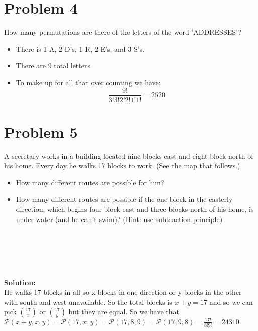 \documentclass{article}
\begin{document}
\section*{Problem 4}
 How many permutations are there of the letters of the word 'ADDRESSES'?
         \begin{itemize}
             \item There is 1 A, 2 D's, 1 R, 2 E's, and 3 S's.
             \item There are 9 total letters
             \item To make up for all that over counting we have: $$\frac{9!}{3!3!2!2!1!1!} = 2520$$
         \end{itemize}
         
\section*{Problem 5}
A secretary works in a building located nine blocks east and eight block north of his home.
Every day he walks 17 blocks to work. (See the map that follows.)
\begin{itemize}
    \item How many different routes are possible for him?
    \item How many different routes are possible if the one block in the easterly direction, which begins four block east and three blocks north of his home,
is under water (and he can't swim)? (Hint: use subtraction principle)
\end{itemize}
\\ \\
\begin{center}
\end{center}
\\ \\
\textbf{Solution: }
\\
He walks 17 blocks in all so x blocks in one direction or y blocks in the other with south and west unavailable. So the total blocks is $x + y = 17$ and so we can pick $\binom{17}{x}$ or $\binom{17}{y}$ but they are equal. So we have that $\mathcal{P}(x+y, x, y) = \mathcal{P}(17, x, y) = \mathcal{P}(17, 8, 9) = \mathcal{P}(17, 9, 8) = \frac{17!}{8!9!} = 24310.$
\end{document}
